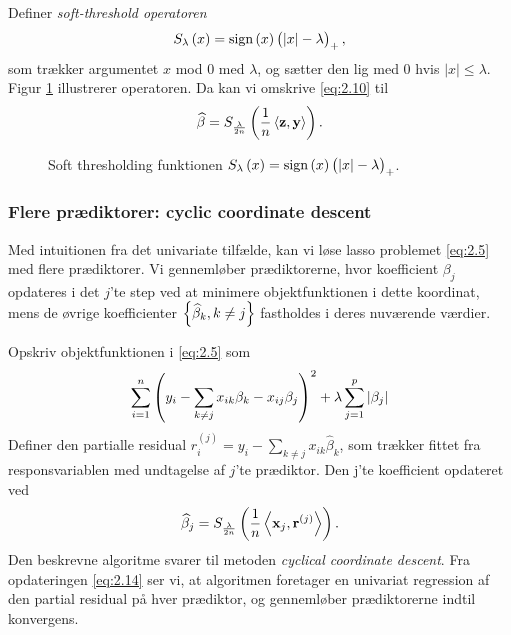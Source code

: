 Definer \textit{soft-threshold operatoren}
\begin{align*}
S_\lambda\del{x}=\text{sign}\del{x} \del{\vert x \vert - \lambda}_+,
\end{align*}
som trækker argumentet $x$ mod 0 med $\lambda$, og sætter den lig med 0 hvis $\vert x \vert \leq \lambda$. 
Figur \ref{fig:soft_thresholding_fct} illustrerer operatoren.
Da kan vi omskrive \eqref{eq:2.10} til
\begin{align*}
\widehat{\beta} = S_{\frac{\lambda}{2n}} \del{\frac{1}{n} \left\langle \mathbf{z}, \mathbf{y} \right\rangle}.
\end{align*}
%
\begin{figure}[H]
\centering
\scalebox{0.8}{}
\caption[optional short text]{Soft thresholding funktionen $S_\lambda\del{x}=\text{sign}\del{x} \del{\vert x \vert - \lambda}_+$.} \label{fig:soft_thresholding_fct}
\end{figure}
%
\subsubsection{Flere prædiktorer: cyclic coordinate descent}
Med intuitionen  fra det univariate tilfælde, kan vi løse lasso problemet \eqref{eq:2.5} med flere prædiktorer.
Vi gennemløber prædiktorerne, hvor koefficient \(\beta_j\) opdateres i det \(j\)'te step ved at minimere objektfunktionen i dette koordinat, mens de øvrige koefficienter $\cbr{\widehat{\beta}_k, k \neq j}$ fastholdes i deres nuværende værdier. 


Opskriv objektfunktionen i \eqref{eq:2.5} som
\begin{align*}
\sum_{i=1}^n \del{y_i - \sum_{k \neq j} x_{ik} \beta_k - x_{ij} \beta_j}^2 + \lambda \sum_{j = 1}^p \vert \beta_j \vert
\end{align*}
Definer den partialle residual $r_i^{(j)}=y_i - \sum_{k \neq j} x_{ik} \widehat{\beta}_k$, som trækker fittet fra responsvariablen med undtagelse af \(j\)'te prædiktor.
Den j'te koefficient opdateret ved
\begin{align}
\widehat{\beta}_j = S_{\frac{\lambda}{2n}} \del{\frac{1}{n} \left\langle \mathbf{x}_j, \mathbf{r}^{(j)} \right\rangle}. \label{eq:2.14}
\end{align}
Den beskrevne algoritme svarer til metoden \textit{cyclical coordinate descent}.
Fra opdateringen \eqref{eq:2.14} ser vi, at algoritmen foretager en univariat regression af den partial residual på hver prædiktor, og gennemløber prædiktorerne indtil konvergens.

